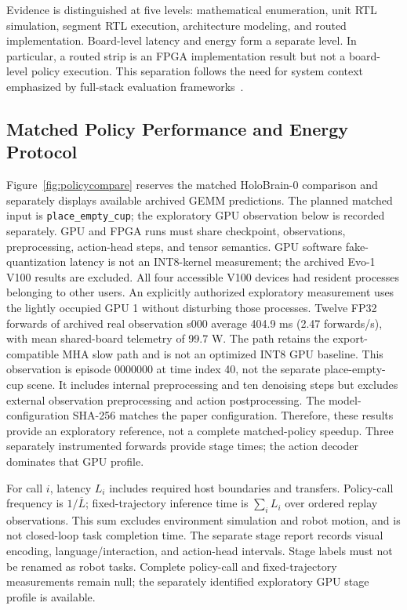 \documentclass[10pt,conference,letterpaper]{IEEEtran}
\begin{document}
Evidence is distinguished at five levels: mathematical enumeration, unit RTL simulation, segment RTL execution, architecture modeling, and routed implementation. Board-level latency and energy form a separate level. In particular, a routed strip is an FPGA implementation result but not a board-level policy execution. This separation follows the need for system context emphasized by full-stack evaluation frameworks~\cite{gemmini}.


\subsection{Matched Policy Performance and Energy Protocol}
Figure~\ref{fig:policycompare} reserves the matched HoloBrain-0 comparison and separately displays available archived GEMM predictions. The planned matched input is \texttt{place\_empty\_cup}; the exploratory GPU observation below is recorded separately. GPU and FPGA runs must share checkpoint, observations, preprocessing, action-head steps, and tensor semantics. GPU software fake-quantization latency is not an INT8-kernel measurement; the archived Evo-1 V100 results are excluded. All four accessible V100 devices had resident processes belonging to other users. An explicitly authorized exploratory measurement uses the lightly occupied GPU 1 without disturbing those processes. Twelve FP32 forwards of archived real observation s000 average 404.9 ms (2.47 forwards/s), with mean shared-board telemetry of 99.7 W. The path retains the export-compatible MHA slow path and is not an optimized INT8 GPU baseline. This observation is episode 0000000 at time index 40, not the separate place-empty-cup scene. It includes internal preprocessing and ten denoising steps but excludes external observation preprocessing and action postprocessing. The model-configuration SHA-256 matches the paper configuration. Therefore, these results provide an exploratory reference, not a complete matched-policy speedup. Three separately instrumented forwards provide stage times; the action decoder dominates that GPU profile.

For call $i$, latency $L_i$ includes required host boundaries and transfers. Policy-call frequency is $1/\overline{L}$; fixed-trajectory inference time is $\sum_i L_i$ over ordered replay observations. This sum excludes environment simulation and robot motion, and is not closed-loop task completion time. The separate stage report records visual encoding, language/interaction, and action-head intervals. Stage labels must not be renamed as robot tasks. Complete policy-call and fixed-trajectory measurements remain null; the separately identified exploratory GPU stage profile is available.
\end{document}

